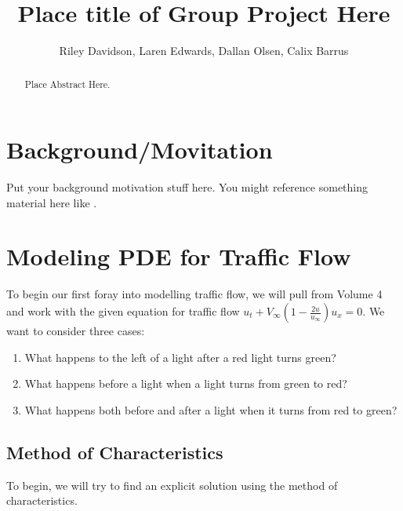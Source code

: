 \documentclass[12pt]{article}
\begin{document}
\title{Place title of Group Project Here}
\author{Riley Davidson, Laren Edwards, Dallan Olsen, Calix Barrus}

\date{}

\maketitle

\begin{abstract}
Place Abstract Here.
\end{abstract}

\section{Background/Movitation}
Put your background motivation stuff here. You might reference something material here like \cite{ref1}.

\section{Modeling PDE for Traffic Flow}

To begin our first foray into modelling traffic flow, we will pull from Volume 4 and work with the given equation for traffic flow $u_t + V_\infty \left(1 - \frac{2u}{u_{\infty}} \right) u_x = 0$. We want to consider three cases:
\begin{enumerate}
    \item What happens to the left of a light after a red light turns green?
    \item What happens before a light when a light turns from green to red? 
    \item What happens both before and after a light when it turns from red to green?
\end{enumerate}

\subsection{Method of Characteristics} 
To begin, we will try to find an explicit solution using the method of characteristics. 
\end{document}
